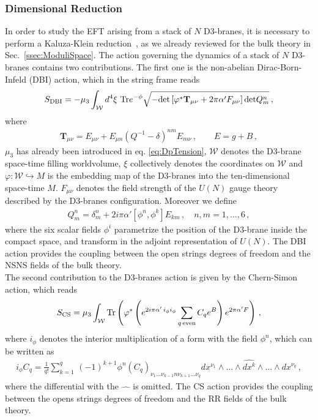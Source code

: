 \documentclass[12pt,a4paper]{book}
\begin{document}
\subsubsection{Dimensional Reduction}

In order to study the EFT arising from a stack of $N$ D3-branes, it is necessary to perform a Kaluza-Klein reduction~\cite{Grana:2003ek}, as we already reviewed for the bulk theory in Sec.~\ref{ssec:ModuliSpace}. The action governing the dynamics of a stack of $N$ D3-branes contains two contributions. The first one is the non-abelian Dirac-Born-Infeld (DBI) action, which in the string frame reads
\begin{align}
\label{eq:DBIAction}
S_{\rm DBI} = - \mu_3 \int_{\mathcal{W}} d^{4}\xi \,\, \text{Tr} e^{-\phi} \sqrt{- \text{det} \left[\varphi^* \mathbf{T}_{\mu \nu} + 2 \pi \alpha' F_{\mu \nu}\right]	 \text{det} Q^n_m}\,,
\end{align}
where
\begin{align}
\label{eq:E}
\mathbf{T}_{\mu \nu} = E_{\mu \nu} + E_{\mu n} \left(Q^{-1} -\delta\right)^{nm} E_{m \nu}\,, \qquad E = g + B \,,
\end{align}
$\mu_3$ has already been introduced in eq. \eqref{eq:DpTension}, $\mathcal{W}$ denotes the D3-brane space-time filling worldvolume, $\xi$ collectively denotes the coordinates on $\mathcal{W}$ and $\varphi: \mathcal{W} \hookrightarrow M$ is the embedding map of the D3-branes into the ten-dimensional space-time $M$. $F_{\mu \nu}$ denotes the field strength of the $U(N)$ gauge theory described by the D3-branes configuration. Moreover we define
\begin{align}
\label{eq:Qnm}
Q^n_m = \delta^n_m + 2 i \pi \alpha' \left[\phi^n, \phi^k\right] E_{km} \,, \quad n, m = 1, \dots, 6 \,,
\end{align}
where the six scalar fields $\phi^i$ parametrize the position of the D3-brane inside the compact space, and transform in the adjoint representation of $U(N)$. The DBI action provides the coupling between the open strings degrees of freedom and the NSNS fields of the bulk theory.\\

The second contribution to the D3-branes action is given by the Chern-Simon action, which reads
\begin{align}
\label{eq:D3CS}
S_{\rm CS} = \mu_3 \int_{\mathcal{W}} \text{Tr} \left(\varphi^* \left(e^{2 i \pi \alpha' \, i_\phi i_\phi} \sum_{q \,\text{even}} C_q e^B\right) e^{2 \pi \alpha' F}\right) \,,
\end{align}
where $i_\phi$ denotes the interior multiplication of a form with the field $\phi^n$, which can be written as
\begin{align}
\label{eq:InteriorProduct}
i_{\phi} C_q = \frac{1}{q!} \sum_{k = 1}^q \, (-1)^{k+1} \phi^n \left(C_q\right)_{\nu_1 \dots \nu_{k-1} n \nu_{k+1} \dots \nu_q} dx^{\nu_1} \wedge \dots \wedge \widehat{dx^k} \wedge \dots \wedge dx^{\nu_q}\,,
\end{align}
where the differential with the $\widehat{\quad}$ is omitted. The CS action provides the coupling between the opens strings degrees of freedom and the RR fields of the bulk theory.\\
\end{document}
